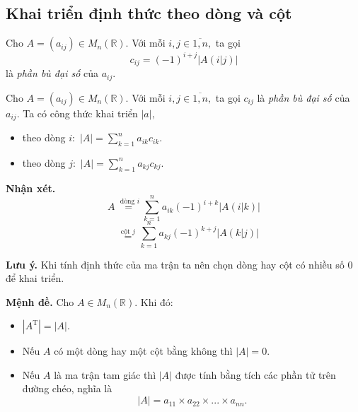 \subsection{Khai triển định thức theo dòng và cột}
Cho $A = \left( {a_{ij}} \right) \in M_n \left( {\mathbb{R}} \right).$  Với mỗi $i,j \in \overline {1,n} ,$ ta gọi
$${c_{ij}} = {\left( { - 1} \right)^{i + j}}\left| {A\left( {\left. i \right|j} \right)} \right|$$
là \textit{phần bù đại số} của $a_{ij}.$
\begin{mybox}
\begin{theorem}
Cho $A = \left( {a_{ij}} \right) \in M_n \left( {\mathbb{R}} \right).$ Với mỗi $i,j \in \overline {1,n} ,$ ta gọi $c_{ij}$ là \textit{phần bù đại số} của $a_{ij}.$ Ta có công thức khai triển $\left| a \right|,$
\begin{itemize}
\item theo dòng $i:$ $\left| A \right| = \sum\limits_{k = 1}^n {{a_{ik}}{c_{ik}}} .$
\item theo dòng $j:$ $\left| A \right| = \sum\limits_{k = 1}^n {{a_{kj}}{c_{kj}}} .$
\end{itemize}
\end{theorem}
\end{mybox}
\begin{mybox}
\textbf{Nhận xét.} 
\[A\mathop  = \limits^{\text{ dòng }i} \sum\limits_{k = 1}^n {{a_{ik}}{{\left( { - 1} \right)}^{i + k}}\left| {A\left( {\left. i \right|k} \right)} \right|} \]
\[\begin{array}{*{20}{c}}
  {}&{\mathop  = \limits^{\text{cột } j} } 
\end{array}\sum\limits_{k = 1}^n {{a_{kj}}{{\left( { - 1} \right)}^{k + j}}\left| {A\left( {\left. k \right|j} \right)} \right|} \]
\end{mybox}
\begin{mybox}
\textbf{Lưu ý.} Khi tính định thức của ma trận ta nên chọn dòng hay cột có nhiều số $0$ để khai triển.
\end{mybox}
\begin{mybox}
\textbf{Mệnh đề.} Cho $A  \in M_n \left( {\mathbb{R}} \right).$ Khi đó:
\begin{itemize}
\item $\left| {{A^{\mathrm{T}}}} \right| = \left| A \right|.$
\item Nếu $A$ có một dòng hay một cột bằng không thì $\left| A \right| = 0.$
\item Nếu $A$ là ma trận tam giác thì $\left| A \right|$ được tính bằng tích các phần tử trên đường chéo, nghĩa là
$$\left| A \right| = a_{11} \times a_{22} \times ... \times a_{nn}.$$
\end{itemize}
\end{mybox}
